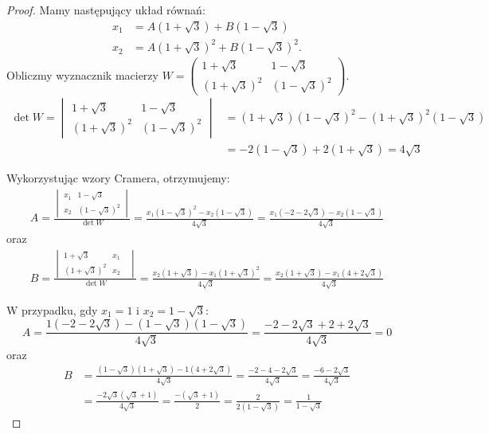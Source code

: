 \documentclass{article}
\begin{document}
\begin{proof}
    Mamy następujący układ równań:
    \begin{align*}
        x_1 &= A(1+\sqrt{3}) + B(1-\sqrt{3}) \\
        x_2 &=  A(1+\sqrt{3})^2 + B(1-\sqrt{3})^2  \text{.}
    \end{align*}
    Obliczmy wyznacznik macierzy 
    \(W = \begin{pmatrix}
            1+\sqrt{3} & 1-\sqrt{3} \\
            (1+\sqrt{3})^2 & (1-\sqrt{3})^2
    \end{pmatrix}\).
    \begin{align*}
        \det{W} = \begin{vmatrix}
            1+\sqrt{3} & 1-\sqrt{3} \\
            (1+\sqrt{3})^2 & (1-\sqrt{3})^2
        \end{vmatrix} 
        &=  (1+\sqrt{3})(1-\sqrt{3})^2 - (1+\sqrt{3})^2(1-\sqrt{3}) \\
        &= -2(1-\sqrt{3}) + 2(1+\sqrt{3}) = 4\sqrt{3}
    \end{align*}
    
    Wykorzystując wzory Cramera, otrzymujemy:
    \begin{align*}
        A = \frac{{\begin{vmatrix}
            x_1 & 1-\sqrt{3} \\
            x_2 & (1-\sqrt{3})^2 
        \end{vmatrix}}}{\det{W}} 
        = \frac{x_1(1-\sqrt{3})^2 - x_2(1-\sqrt{3})}{4\sqrt{3}} = 
        \frac{x_1(-2-2\sqrt{3}) - x_2(1-\sqrt{3})}{4\sqrt{3}}
    \end{align*}
    oraz
    \begin{align*}
        B = \frac{{\begin{vmatrix}
            1+\sqrt{3} & x_1 & \\
            (1+\sqrt{3})^2 & x_2 
        \end{vmatrix}}}{\det{W}} 
        = \frac{x_2(1+\sqrt{3}) - x_1(1+\sqrt{3})^2}{4\sqrt{3}} = 
        \frac{x_2(1+\sqrt{3}) - x_1(4+2\sqrt{3})}{4\sqrt{3}}
    \end{align*} 

    W przypadku, gdy \(x_1 = 1\) i \(x_2 = 1 - \sqrt{3}\):
    \[
        A = \frac{1(-2-2\sqrt{3}) - (1-\sqrt{3})(1-\sqrt{3})}{4\sqrt{3}} = \frac{-2-2\sqrt{3}+2+2\sqrt{3}}{4\sqrt{3}} = 0
    \]
    oraz
    \begin{align*}
        B &= \frac{(1-\sqrt{3})(1+\sqrt{3}) - 1(4+2\sqrt{3})}{4\sqrt{3}} = \frac{-2-4-2\sqrt{3}}{4\sqrt{3}} = \frac{-6-2\sqrt{3}}{4\sqrt{3}} \\
        &= \frac{-2\sqrt{3}(\sqrt{3}+1)}{4\sqrt{3}} = \frac{-(\sqrt{3}+1)}{2} = \frac{2}{2(1-\sqrt{3})} = \frac{1}{1-\sqrt{3}}
    \end{align*}
           
\end{proof}
\end{document}
